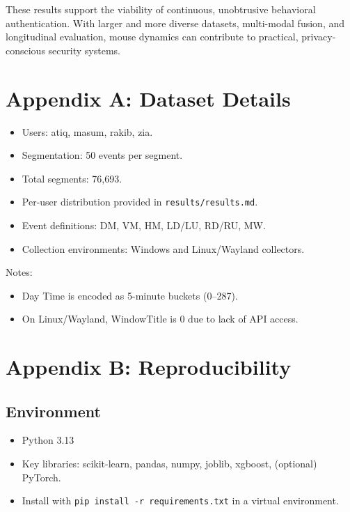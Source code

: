 \documentclass[
  12pt,
]{article}
\providecommand{\tightlist}{%
  \setlength{\itemsep}{0pt}\setlength{\parskip}{0pt}}
\begin{document}
These results support the viability of continuous, unobtrusive
behavioral authentication. With larger and more diverse datasets,
multi-modal fusion, and longitudinal evaluation, mouse dynamics can
contribute to practical, privacy-conscious security systems.

\section{Appendix A: Dataset Details}\label{appendix-a-dataset-details}

\begin{itemize}
\tightlist
\item
  Users: atiq, masum, rakib, zia.
\item
  Segmentation: 50 events per segment.
\item
  Total segments: 76,693.
\item
  Per-user distribution provided in \texttt{results/results.md}.
\item
  Event definitions: DM, VM, HM, LD/LU, RD/RU, MW.
\item
  Collection environments: Windows and Linux/Wayland collectors.
\end{itemize}

Notes:

\begin{itemize}
\tightlist
\item
  Day Time is encoded as 5-minute buckets (0--287).
\item
  On Linux/Wayland, WindowTitle is 0 due to lack of API access.
\end{itemize}

\section{Appendix B: Reproducibility}\label{appendix-b-reproducibility}

\subsection{Environment}\label{environment}

\begin{itemize}
\tightlist
\item
  Python 3.13
\item
  Key libraries: scikit-learn, pandas, numpy, joblib, xgboost,
  (optional) PyTorch.
\item
  Install with \texttt{pip\ install\ -r\ requirements.txt} in a virtual
  environment.
\end{itemize}
\end{document}
